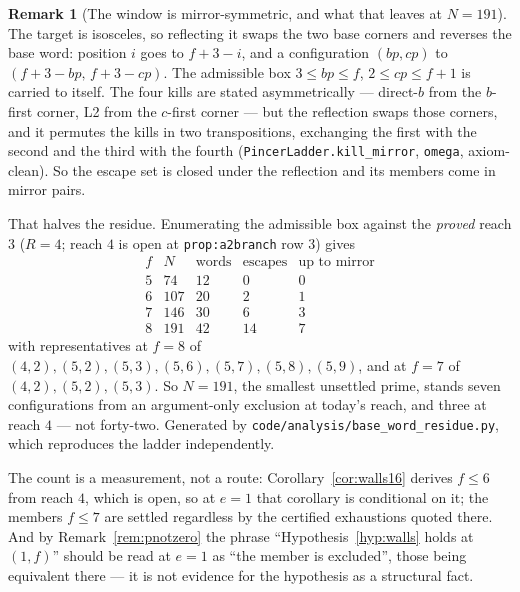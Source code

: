\documentclass[11pt,reqno]{amsart}
\theoremstyle{plain}
\theoremstyle{definition}
\newtheorem{remark}[theorem]{Remark}
\begin{document}
\begin{remark}[The window is mirror-symmetric, and what that leaves at $N=191$]\label{rem:mirrorwindow}
The target is isosceles, so reflecting it swaps the two base corners and reverses the base word:
position $i$ goes to $f+3-i$, and a configuration $(bp,cp)$ to $(f+3-bp,\,f+3-cp)$. The admissible
box $3\le bp\le f$, $2\le cp\le f+1$ is carried to itself. The four kills are stated
asymmetrically --- direct-$b$ from the $b$-first corner, L2 from the $c$-first corner --- but the
reflection swaps those corners, and it permutes the kills in two transpositions, exchanging the
first with the second and the third with the fourth (\texttt{PincerLadder.kill\_mirror},
\texttt{omega}, axiom-clean). So the escape set is closed under the reflection and its members come
in mirror pairs.

That halves the residue. Enumerating the admissible box against the \emph{proved} reach $3$
($R=4$; reach $4$ is open at \texttt{prop:a2branch} row $3$) gives
\[
\begin{array}{rrrrr}
f & N & \text{words} & \text{escapes} & \text{up to mirror}\\\hline
5 & 74 & 12 & 0 & 0\\
6 & 107 & 20 & 2 & 1\\
7 & 146 & 30 & 6 & 3\\
8 & 191 & 42 & 14 & 7
\end{array}
\]
with representatives at $f=8$ of $(4,2),(5,2),(5,3),(5,6),(5,7),(5,8),(5,9)$, and at $f=7$ of
$(4,2),(5,2),(5,3)$. So $N=191$, the smallest unsettled prime, stands seven configurations from an
argument-only exclusion at today's reach, and three at reach $4$ --- not forty-two. Generated by
\texttt{code/analysis/base\_word\_residue.py}, which reproduces the ladder independently.

The count is a measurement, not a route: Corollary~\ref{cor:walls16} derives $f\le6$ from reach
$4$, which is open, so at $e=1$ that corollary is conditional on it; the members $f\le7$ are settled
regardless by the certified exhaustions quoted there. And by Remark~\ref{rem:pnotzero} the phrase
``Hypothesis~\ref{hyp:walls} holds at $(1,f)$'' should be read at $e=1$ as ``the member is
excluded'', those being equivalent there --- it is not evidence for the hypothesis as a structural
fact.
\end{remark}
\end{document}
